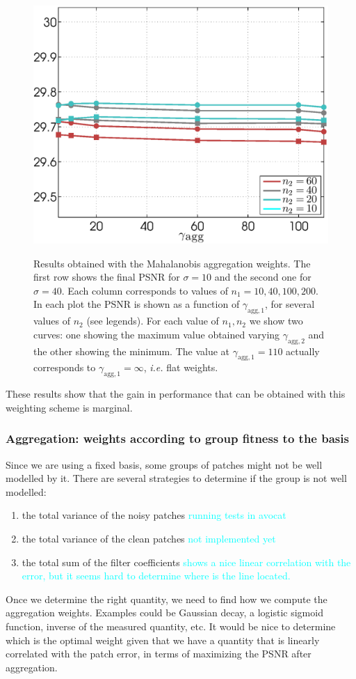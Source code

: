\documentclass{ipol}
\begin{document}
\begin{figure}[ht!]
	\includegraphics[width=.25\textwidth]{f/nldct/WIE1pos_fpsnr_np2-gagg-curves_1np200_s40_average.eps}\\
                                         
	\caption{Results obtained with the Mahalanobis aggregation weights. The
		first row shows the final PSNR for $\sigma = 10$ and the second one for
		$\sigma = 40$. 
		Each column corresponds to values of $n_1 = 10, 40, 100, 200$. 
		In each plot the PSNR is
		shown as a function of $\gamma_{\text{agg},1}$, for several values of $n_2$ (see
		legends). For each value of $n_1,n_2$ we show two curves: one showing the maximum
		value obtained varying $\gamma_{\text{agg},2}$ and the other showing the minimum.
		The value at $\gamma_{\text{agg},1} = 110$ actually corresponds to
		$\gamma_{\text{agg},1} = \infty$, \textit{i.e.} flat weights.
		}
	\label{fig:patch_mahalanobis_agg}
\end{figure}

These results show that the gain in performance that can be obtained with this
weighting scheme is marginal.

\subsubsection{Aggregation: weights according to group fitness to the basis}

Since we are using a fixed basis, some groups of patches might not be well modelled
by it. There are several strategies to determine if the group is not well modelled:
\begin{enumerate}
	\item the total variance of the noisy patches \textcolor{cyan}{running tests in avocat}
	\item the total variance of the clean patches \textcolor{cyan}{not implemented yet}
	\item the total sum of the filter coefficients \textcolor{cyan}{shows a nice
		linear correlation with the error, but it seems hard to determine where
		is the line located.}
\end{enumerate}

Once we determine the right quantity, we need to find how we compute the
aggregation weights. Examples could be Gaussian decay, a logistic sigmoid function,
inverse of the measured quantity, etc. It would be nice to determine which is the 
optimal weight given that we have a quantity that is linearly correlated with the
patch error, in terms of maximizing the PSNR after aggregation.
\end{document}
